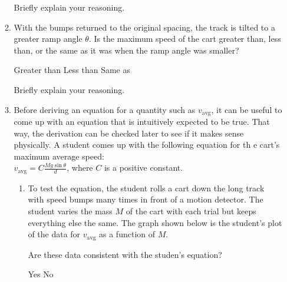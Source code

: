 \documentclass{../../../oss-apphys}
\begin{document}
\begin{enumerate}[leftmargin=15pt]
\begin{enumerate}[nosep]
    \vspace{.2in}Briefly explain your reasoning.
    \vspace{.4in}
  \item With the bumps returned to the original spacing, the track is tilted to
    a greater ramp angle $\theta$. Is the maximum speed of the cart greater
    than, less than, or the same as it was when the ramp angle was smaller?

    \vspace{.2in}
    \underline{\hspace{.25in}} Greater than\hspace{.5in}
    \underline{\hspace{.25in}} Less than\hspace{.5in}
    \underline{\hspace{.25in}} Same as

    \vspace{.2in}Briefly explain your reasoning.
    \newpage

  \item Before deriving an equation for a quantity such as $v_\mathrm{avg}$, it
    can be useful to come up with an equation that is intuitively expected to
    be true. That way, the derivation can be checked later to see if it makes
    sense physically. A student comes up with the following equation for th
    e cart's maximum average speed:\\
    $\displaystyle v_\mathrm{avg}=C\frac{Mg\sin\theta}{d}$, where $C$ is a
    positive constant.
    \begin{enumerate}[nosep]
    \item To test the equation, the student rolls a cart down the long track
      with speed bumps many times in front of a motion detector. The student
      varies the mass $M$ of the cart with each trial but keeps everything else
      the same. The graph shown below is the student's plot of the data for
      $v_\mathrm{avg}$ as a function of $M$.
      \begin{center}
      \end{center}
      Are these data consistent with the studen's equation?

      \vspace{.1in}
      \underline{\hspace{.25in}} Yes\hspace{.5in}
      \underline{\hspace{.25in}} No


\end{enumerate}
\end{enumerate}
\end{enumerate}
\end{document}
